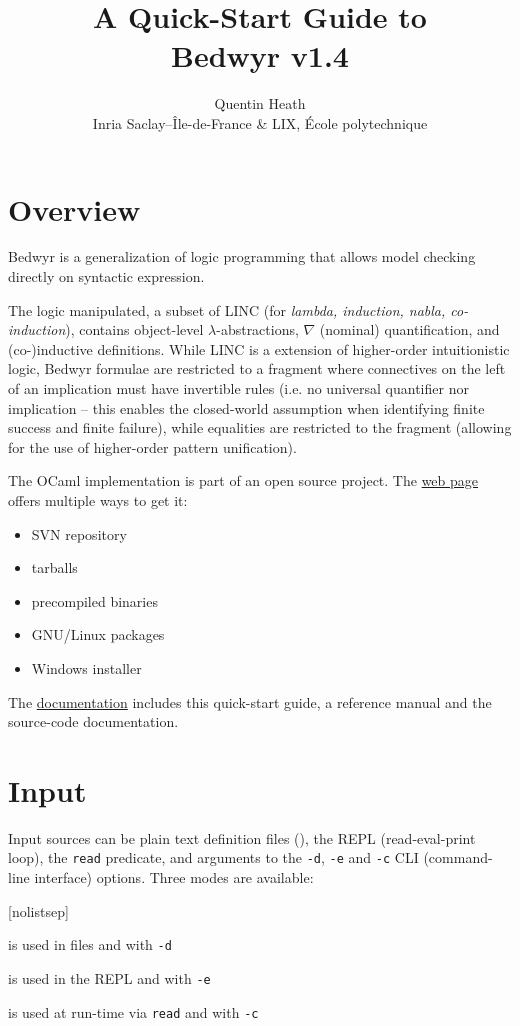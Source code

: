 \documentclass[a4paper,twocolumn]{article}
\title{{\Huge A Quick-Start Guide to\\Bedwyr v1.4}}
\author{Quentin Heath\\
        Inria Saclay--\^Ile-de-France \& LIX, \'Ecole polytechnique}
\begin{document}
\maketitle

\section{Overview}

Bedwyr is a generalization of logic programming that allows model
checking directly on syntactic expression.

The logic manipulated, a subset of LINC (for \emph{lambda, induction,
nabla, co-induction}), contains object-level $\lambda$-abstractions,
$\nabla$ (nominal) quantification, and (co-)inductive definitions.
While LINC is a extension of higher-order intuitionistic logic, Bedwyr
formulae are restricted to a fragment where connectives on the left of
an implication must have invertible rules (i.e. no universal
quantifier nor implication -- this enables the closed-world assumption
when identifying finite success and finite failure), while equalities
are restricted to the \Ll{} fragment (allowing for the use of
higher-order pattern unification).

The OCaml implementation is part of an open source project.  The
\href{http://slimmer.gforge.inria.fr/bedwyr/#download}{web page}
offers multiple ways to get it:
\begin{itemize}%
[nolistsep]
  \item SVN repository
  \item tarballs
  \item precompiled binaries
  \item GNU/Linux packages
  \item Windows installer
\end{itemize}

The
\href{http://slimmer.gforge.inria.fr/bedwyr/#documentation}{documentation}
includes this quick-start guide, a reference manual and the
source-code documentation.

\section{Input}

Input sources can be plain text definition files (), the
REPL (read-eval-print loop), the \lstinline+read+ predicate, and
arguments to the \texttt{-d}, \texttt{-e} and \texttt{-c} CLI
(command-line interface) options.  Three modes are available:
\begin{description}%
[nolistsep]
  \item[definition mode] is used in  files and with
    \texttt{-d}
  \item[toplevel mode] is used in the REPL and with \texttt{-e}
  \item[term mode] is used at run-time via \lstinline+read+ and with
    \texttt{-c}
\end{description}
\end{document}
